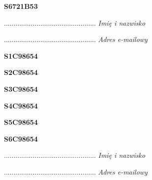 \begin{turn}{90}\huge \textbf{S6721B53}\end{turn}

\begin{turn}{90}\begin{minipage}{\linewidth} \vspace{20mm} ................................................  \textit{Imię i nazwisko}\end{minipage}\end{turn}

\begin{turn}{90}\begin{minipage}{\linewidth} \vspace{20mm} ................................................  \textit{Adres e-mailowy}\end{minipage}\end{turn}

\begin{turn}{90}\huge \textbf{S1C98654}\end{turn}

\begin{turn}{90}\huge \textbf{S2C98654}\end{turn}

\begin{turn}{90}\huge \textbf{S3C98654}\end{turn}

\begin{turn}{90}\huge \textbf{S4C98654}\end{turn}

\begin{turn}{90}\huge \textbf{S5C98654}\end{turn}

\begin{turn}{90}\huge \textbf{S6C98654}\end{turn}

\begin{turn}{90}\begin{minipage}{\linewidth} \vspace{20mm} ................................................  \textit{Imię i nazwisko}\end{minipage}\end{turn}

\begin{turn}{90}\begin{minipage}{\linewidth} \vspace{20mm} ................................................  \textit{Adres e-mailowy}\end{minipage}\end{turn}

